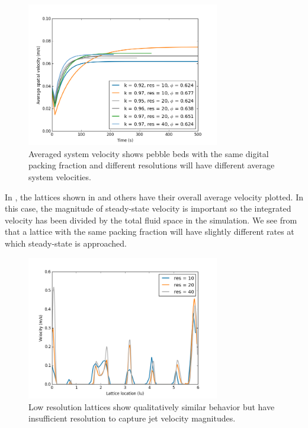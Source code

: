 \begin{figure}[ht]
    \centering
    \includegraphics[width=0.75\textwidth]{figures/lbm/3d-lbm-settings-velocity}
    \caption{Averaged system velocity shows pebble beds with the same digital packing fraction and different resolutions will have different average system velocities.}\label{fig:3d-lbm-settings-velocity}
\end{figure}

In , the lattices shown in  and others have their overall average velocity plotted. In this case, the magnitude of steady-state velocity is important so the integrated velocity has been divided by the total fluid space in the simulation. We see from  that a lattice with the same packing fraction will have slightly different rates at which steady-state is approached. 

\begin{figure}[ht]
    \centering
    \includegraphics[width=0.75\textwidth]{figures/lbm/3d-bed-v-profiles}
    \caption{Low resolution lattices show qualitatively similar behavior but have insufficient resolution to capture jet velocity magnitudes.}\label{fig:3d-bed-v-profiles}
\end{figure}

